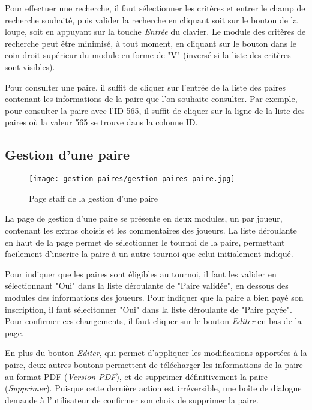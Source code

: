 Pour effectuer une recherche, il faut sélectionner les critères et entrer le champ de recherche souhaité, puis valider la recherche en cliquant soit sur le bouton de la loupe, soit en appuyant sur la touche \textit{Entrée} du clavier. Le module des critères de recherche peut être minimisé, à tout moment, en cliquant sur le bouton dans le coin droit supérieur du module en forme de "V" (inversé si la liste des critères sont visibles).\newline

Pour consulter une paire, il suffit de cliquer sur l'entrée de la liste des paires contenant les informations de la paire que l'on souhaite consulter. Par exemple, pour consulter la paire avec l'ID 565, il suffit de cliquer sur la ligne de la liste des paires où la valeur 565 se trouve dans la colonne ID.

\subsection{Gestion d'une paire}

\begin{figure}[H]
\centering
\texttt{[image: gestion-paires/gestion-paires-paire.jpg]}
\caption{Page staff de la gestion d'une paire}
\end{figure}

La page de gestion d'une paire se présente en deux modules, un par joueur, contenant les extras choisis et les commentaires des joueurs. La liste déroulante en haut de la page permet de sélectionner le tournoi de la paire, permettant facilement d'inscrire la paire à un autre tournoi que celui initialement indiqué.\newline

Pour indiquer que les paires sont éligibles au tournoi, il faut les valider en sélectionnant "Oui" dans la liste déroulante de "Paire validée", en dessous des modules des informations des joueurs. Pour indiquer que la paire a bien payé son inscription, il faut sélecitonner "Oui" dans la liste déroulante de "Paire payée". Pour confirmer ces changements, il faut cliquer sur le bouton \textit{Editer} en bas de la page.\newline

En plus du bouton \textit{Editer}, qui permet d'appliquer les modifications apportées à la paire, deux autres boutons permettent de télécharger les informations de la paire au format PDF (\textit{Version PDF}), et de supprimer définitivement la paire (\textit{Supprimer}). Puisque cette dernière action est irréversible, une boîte de dialogue demande à l'utilisateur de confirmer son choix de supprimer la paire.
